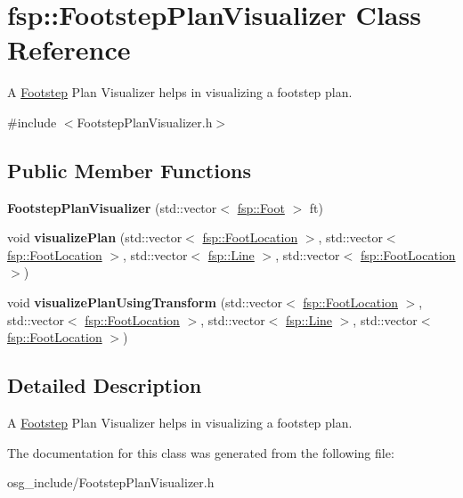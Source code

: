 \hypertarget{classfsp_1_1_footstep_plan_visualizer}{\section{fsp\-:\-:Footstep\-Plan\-Visualizer Class Reference}
\label{classfsp_1_1_footstep_plan_visualizer}
}


A \hyperlink{class_footstep}{Footstep} Plan Visualizer helps in visualizing a footstep plan.  




{\ttfamily \#include $<$Footstep\-Plan\-Visualizer.\-h$>$}

\subsection*{Public Member Functions}
\begin{DoxyCompactItemize}
\item 
\hypertarget{classfsp_1_1_footstep_plan_visualizer_abbd43ea167ad5088a316a8e8711ab144}{{\bfseries Footstep\-Plan\-Visualizer} (std\-::vector$<$ \hyperlink{classfsp_1_1_foot}{fsp\-::\-Foot} $>$ ft)}\label{classfsp_1_1_footstep_plan_visualizer_abbd43ea167ad5088a316a8e8711ab144}

\item 
\hypertarget{classfsp_1_1_footstep_plan_visualizer_a55649919e267e2e34ae2403df451f7df}{void {\bfseries visualize\-Plan} (std\-::vector$<$ \hyperlink{classfsp_1_1_foot_location}{fsp\-::\-Foot\-Location} $>$, std\-::vector$<$ \hyperlink{classfsp_1_1_foot_location}{fsp\-::\-Foot\-Location} $>$, std\-::vector$<$ \hyperlink{classfsp_1_1_line}{fsp\-::\-Line} $>$, std\-::vector$<$ \hyperlink{classfsp_1_1_foot_location}{fsp\-::\-Foot\-Location} $>$)}\label{classfsp_1_1_footstep_plan_visualizer_a55649919e267e2e34ae2403df451f7df}

\item 
\hypertarget{classfsp_1_1_footstep_plan_visualizer_a824a016942087a8009320deefa0dcbd5}{void {\bfseries visualize\-Plan\-Using\-Transform} (std\-::vector$<$ \hyperlink{classfsp_1_1_foot_location}{fsp\-::\-Foot\-Location} $>$, std\-::vector$<$ \hyperlink{classfsp_1_1_foot_location}{fsp\-::\-Foot\-Location} $>$, std\-::vector$<$ \hyperlink{classfsp_1_1_line}{fsp\-::\-Line} $>$, std\-::vector$<$ \hyperlink{classfsp_1_1_foot_location}{fsp\-::\-Foot\-Location} $>$)}\label{classfsp_1_1_footstep_plan_visualizer_a824a016942087a8009320deefa0dcbd5}

\end{DoxyCompactItemize}


\subsection{Detailed Description}
A \hyperlink{class_footstep}{Footstep} Plan Visualizer helps in visualizing a footstep plan. 

The documentation for this class was generated from the following file\-:\begin{DoxyCompactItemize}
\item 
osg\-\_\-include/Footstep\-Plan\-Visualizer.\-h\end{DoxyCompactItemize}
